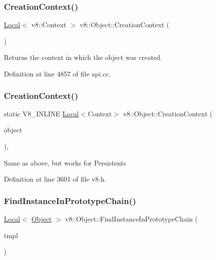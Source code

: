 \subsubsection{\texorpdfstring{Creation\+Context()}{CreationContext()}\hspace{0.1cm}{\footnotesize\ttfamily [1/2]}}
{\footnotesize\ttfamily \mbox{\hyperlink{classv8_1_1Local}{Local}}$<$ v8\+::\+Context $>$ v8\+::\+Object\+::\+Creation\+Context (\begin{DoxyParamCaption}{ }\end{DoxyParamCaption})}

Returns the context in which the object was created. 

Definition at line 4857 of file api.\+cc.

\mbox{\label{classv8_1_1Object_ae958203f358c7af3727ef7179790d01f}} 
\subsubsection{\texorpdfstring{Creation\+Context()}{CreationContext()}\hspace{0.1cm}{\footnotesize\ttfamily [2/2]}}
{\footnotesize\ttfamily static V8\+\_\+\+I\+N\+L\+I\+NE \mbox{\hyperlink{classv8_1_1Local}{Local}}$<$Context$>$ v8\+::\+Object\+::\+Creation\+Context (\begin{DoxyParamCaption}\item[{const \mbox{\hyperlink{classv8_1_1PersistentBase}{Persistent\+Base}}$<$ \mbox{\hyperlink{classv8_1_1Object}{Object}} $>$ \&}]{object }\end{DoxyParamCaption})\hspace{0.3cm}{\ttfamily [inline]}, {\ttfamily [static]}}

Same as above, but works for Persistents 

Definition at line 3601 of file v8.\+h.

\mbox{\label{classv8_1_1Object_abd62f72947a0ddad5ada4fbfbb0194ef}} 
\subsubsection{\texorpdfstring{Find\+Instance\+In\+Prototype\+Chain()}{FindInstanceInPrototypeChain()}}
{\footnotesize\ttfamily \mbox{\hyperlink{classv8_1_1Local}{Local}}$<$ \mbox{\hyperlink{classv8_1_1Object}{Object}} $>$ v8\+::\+Object\+::\+Find\+Instance\+In\+Prototype\+Chain (\begin{DoxyParamCaption}\item[{\mbox{\hyperlink{classv8_1_1Local}{v8\+::\+Local}}$<$ \mbox{\hyperlink{classv8_1_1FunctionTemplate}{Function\+Template}} $>$}]{tmpl }\end{DoxyParamCaption})}

